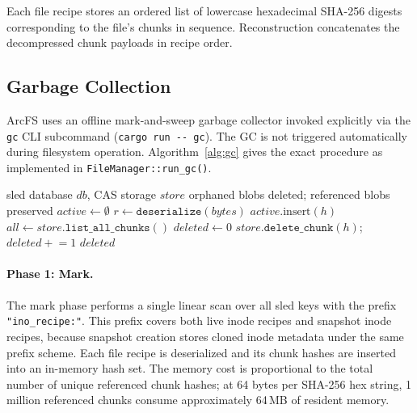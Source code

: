 \documentclass[5p,times]{elsarticle}
\begin{document}
Each file recipe stores an ordered list of lowercase hexadecimal SHA-256
digests corresponding to the file's chunks in sequence.
Reconstruction concatenates the decompressed chunk payloads in recipe
order.

\subsection{Garbage Collection}
\label{sec:gc}

ArcFS uses an offline mark-and-sweep garbage collector invoked explicitly
via the \texttt{gc} CLI subcommand (\texttt{cargo run -{}- gc}).  The GC
is not triggered automatically during filesystem operation.  Algorithm~\ref{alg:gc}
gives the exact procedure as implemented in \texttt{FileManager::run\_gc()}.

\begin{algorithm}
\caption{Offline Garbage Collection (\texttt{run\_gc()})}
\label{alg:gc}
\small
\begin{algorithmic}[1]
\REQUIRE sled database $\mathit{db}$, CAS storage $\mathit{store}$
\ENSURE orphaned blobs deleted; referenced blobs preserved
\STATE $\mathit{active} \leftarrow \emptyset$ \; 
  \STATE $r \leftarrow \texttt{deserialize}(\mathit{bytes})$
    \STATE $\mathit{active}.\text{insert}(h)$
  \ENDFOR
\ENDFOR
\STATE $\mathit{all} \leftarrow \mathit{store}.\texttt{list\_all\_chunks}()$
\STATE $\mathit{deleted} \leftarrow 0$
    \STATE $\mathit{store}.\texttt{delete\_chunk}(h)$;\;
           $\mathit{deleted} \mathrel{+}= 1$
  \ENDIF
\ENDFOR
\RETURN $\mathit{deleted}$
\end{algorithmic}
\end{algorithm}

\paragraph{Phase 1: Mark.}
The mark phase performs a single linear scan over all sled keys with the
prefix \texttt{"ino\_recipe:"}.  This prefix covers both live inode
recipes and snapshot inode recipes, because snapshot creation stores
cloned inode metadata under the same prefix scheme.  Each
file recipe is deserialized and its chunk hashes are inserted into
an in-memory hash set.  The memory cost is proportional to the total
number of unique referenced chunk hashes; at 64 bytes per SHA-256 hex
string, 1 million referenced chunks consume approximately 64\,MB of
resident memory.
\end{document}
